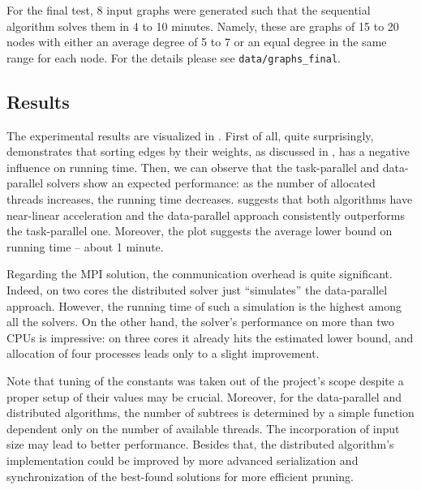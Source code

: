 \documentclass[epsf,epic,eepic,eepicemu]{article}
\begin{document}
For the final test, 8 input graphs were generated such that the sequential algorithm solves them in 4 to 10 minutes. Namely, these are graphs of 15 to 20 nodes with either an average degree of 5 to 7 or an equal degree in the same range for each node. For the details please see \texttt{data/graphs\_final}.

\subsection*{Results}
The experimental results are visualized in . First of all, quite surprisingly,  demonstrates that sorting edges by their weights, as discussed in , has a negative influence on running time. Then, we can observe that the task-parallel and data-parallel solvers show an expected performance: as the number of allocated threads increases, the running time decreases.  suggests that both algorithms have near-linear acceleration and the data-parallel approach consistently outperforms the task-parallel one. Moreover, the plot suggests the average lower bound on running time -- about 1 minute.

Regarding the MPI solution, the communication overhead is quite significant. Indeed, on two cores the distributed solver just ``simulates'' the data-parallel approach. However, the running time of such a simulation is the highest among all the solvers. On the other hand, the solver's performance on more than two CPUs is impressive: on three cores it already hits the estimated lower bound, and allocation of four processes leads only to a slight improvement.

Note that tuning of the constants was taken out of the project's scope despite a proper setup of their values may be crucial. Moreover, for the data-parallel and distributed algorithms, the number of subtrees is determined by a simple function dependent only on the number of available threads. The incorporation of input size may lead to better performance. Besides that, the distributed algorithm's implementation could be improved by more advanced serialization and synchronization of the best-found solutions for more efficient pruning.
\end{document}
